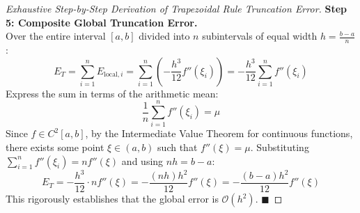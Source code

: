 \begin{proof}[Exhaustive Step-by-Step Derivation of Trapezoidal Rule Truncation Error]
\noindent\textbf{Step 5: Composite Global Truncation Error.} \\
Over the entire interval $[a, b]$ divided into $n$ subintervals of equal width $h = \frac{b - a}{n}$:
\begin{equation}
    E_T = \sum_{i=1}^n E_{\text{local}, i} = \sum_{i=1}^n \left( -\frac{h^3}{12} f''(\xi_i) \right) = -\frac{h^3}{12} \sum_{i=1}^n f''(\xi_i)
\end{equation}
Express the sum in terms of the arithmetic mean:
\begin{equation}
    \frac{1}{n} \sum_{i=1}^n f''(\xi_i) = \mu
\end{equation}
Since $f \in C^2[a, b]$, by the Intermediate Value Theorem for continuous functions, there exists some point $\xi \in (a, b)$ such that $f''(\xi) = \mu$.
Substituting $\sum_{i=1}^n f''(\xi_i) = n f''(\xi)$ and using $n h = b - a$:
\begin{equation}
    E_T = -\frac{h^3}{12} \cdot n f''(\xi) = -\frac{(n h) h^2}{12} f''(\xi) = \boxed{-\frac{(b - a) h^2}{12} f''(\xi)}
\end{equation}
This rigorously establishes that the global error is $\mathcal{O}(h^2)$. $\blacksquare$
\end{proof}


